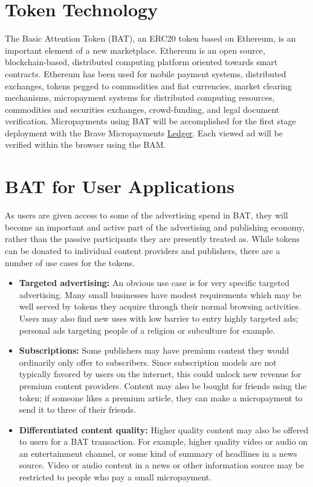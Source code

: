 \documentclass[twocolumn,9pt]{article}
\newcommand{\bat}{\textsf{BAT}\xspace}
\begin{document}
\section{Token Technology}
\label{sec-4-2}

The Basic Attention Token (\bat), an ERC20 token based on Ethereum, is an important element of a new marketplace. Ethereum is an open source, blockchain-based, distributed computing platform oriented towards smart contracts. 
Ethereum has been used for mobile payment systems, distributed exchanges, tokens pegged to commodities and fiat currencies, market clearing mechanisms, micropayment systems for distributed computing resources, commodities and securities exchanges, crowd-funding, and legal document verification. %
Micropayments using \bat will be accomplished for the first stage deployment with the Brave Micropayments \href{https://github.com/brave/ledger}{Ledger}. Each viewed ad will be verified within the browser using the BAM. 

\section{\bat for User Applications}
\label{sec-4-4}

As users are given access to some of the advertising spend in \bat, they will become an important and active part of the advertising and publishing economy, rather than the passive participants they are presently treated as. While tokens can be donated to individual content providers and publishers, there are a number of use cases for the tokens.

\begin{itemize}\itemsep=-3pt
	\item 
\textbf{Targeted advertising:} An obvious use case is for very specific targeted advertising. Many small businesses have modest requirements which may be well served by tokens they acquire through their normal browsing activities. Users may also find new uses with low barrier to entry highly targeted ads; personal ads targeting people of a religion or subculture for example.
\item
\textbf{Subscriptions:} 
Some publishers may have premium content they would ordinarily only offer to subscribers. Since subscription models are not typically favored by users on the internet, this could unlock new revenue for premium content providers. Content may also be bought for friends using the token; if someone likes a premium article, they can make a micropayment to send it to three of their friends.
\item 
\textbf{Differentiated content quality:} 
Higher quality content may also be offered to users for a \bat transaction. For example, higher quality video or audio on an entertainment channel, or some kind of summary of headlines in a news source. Video or audio content in a news or other information source may be restricted to people who pay a small micropayment.
\end{itemize}
\end{document}
